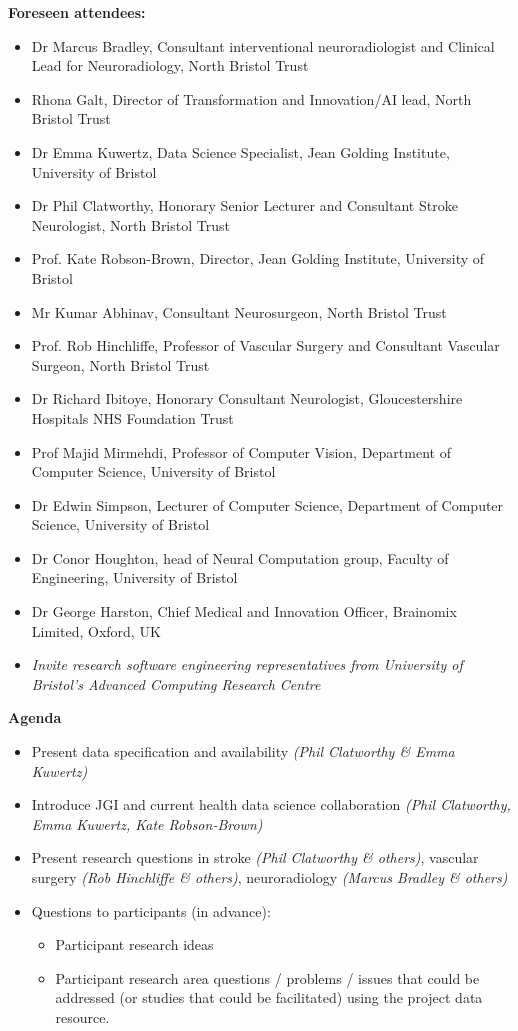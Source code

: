 \documentclass{article}
\begin{document}
\textbf{Foreseen attendees:}
\begin{itemize}
\item Dr Marcus Bradley, Consultant interventional neuroradiologist
  and Clinical Lead for Neuroradiology, North Bristol Trust
\item Rhona Galt, Director of Transformation and Innovation/AI lead,
  North Bristol Trust
\item Dr Emma Kuwertz, Data Science Specialist, Jean Golding
  Institute, University of Bristol
\item Dr Phil Clatworthy, Honorary Senior Lecturer and
  Consultant Stroke Neurologist, North Bristol Trust
\item Prof. Kate Robson-Brown, Director, Jean Golding
  Institute, University of Bristol
\item Mr Kumar Abhinav, Consultant Neurosurgeon, North Bristol Trust
\item Prof. Rob Hinchliffe, Professor of Vascular Surgery and
  Consultant Vascular Surgeon, North Bristol Trust
\item Dr Richard Ibitoye, Honorary Consultant Neurologist,
  Gloucestershire Hospitals NHS Foundation Trust
\item Prof Majid Mirmehdi, Professor of Computer Vision, Department of
  Computer Science, University of Bristol
\item Dr Edwin Simpson, Lecturer of Computer Science, Department of
  Computer Science, University of Bristol
\item Dr Conor Houghton, head of Neural Computation group, Faculty
  of Engineering, University of Bristol
\item Dr George Harston, Chief Medical and Innovation Officer,
  Brainomix Limited, Oxford, UK
\item \textit{Invite research software engineering representatives from
    University of Bristol's Advanced Computing Research Centre}
\end{itemize}

\textbf{Agenda}
\begin{itemize}
\item    Present data specification and availability \textit{(Phil
    Clatworthy \& Emma Kuwertz)}
\item    Introduce JGI and current health data science collaboration \textit{(Phil
    Clatworthy, Emma Kuwertz, Kate Robson-Brown)}
\item    Present research questions in stroke \textit{(Phil
    Clatworthy \& others)}, vascular surgery \textit{(Rob Hinchliffe
    \& others)},
  neuroradiology \textit{(Marcus Bradley \& others)}
\item Questions to participants (in advance):
  \begin{itemize}
  \item Participant research ideas
  \item Participant research area questions / problems / issues that
    could be addressed (or studies that could be facilitated) using
    the project data resource.
  \end{itemize}
\end{itemize}
\end{document}
